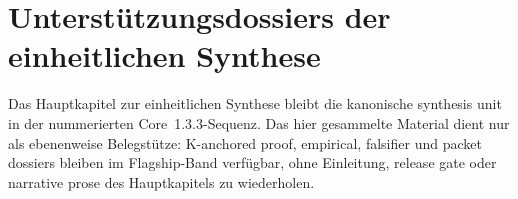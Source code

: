 \section{Unterstützungsdossiers der einheitlichen Synthese}
\label{sec:oc-core-1-3-synthesis-support-dossiers}

Das Hauptkapitel zur einheitlichen Synthese bleibt die kanonische synthesis
unit in der nummerierten Core~1.3.3-Sequenz. Das hier gesammelte Material dient
nur als ebenenweise Belegstütze: K-anchored proof, empirical, falsifier und
packet dossiers bleiben im Flagship-Band verfügbar, ohne Einleitung,
release gate oder narrative prose des Hauptkapitels zu wiederholen.


